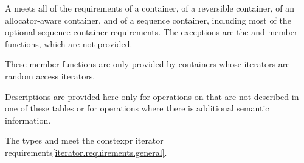 \pnum
A  meets all of the requirements
of a container,
of a reversible container,
of an allocator-aware container, and
of a sequence container,
including most of the optional sequence container
requirements.
The exceptions are the
and
member functions, which are not provided.
\begin{footnote}
These member functions
are only provided by containers whose iterators
are random access iterators.
\end{footnote}
Descriptions are provided here only for operations on
that are not described in one of these tables
or for operations where there is additional semantic information.

\pnum
The types  and  meet
the constexpr iterator requirements\ref{iterator.requirements.general}.

